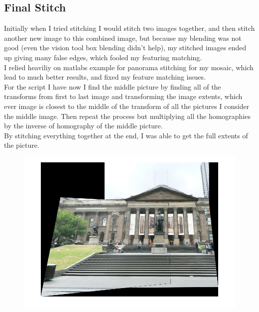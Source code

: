 \documentclass[11pt,english]{article}
\begin{document}
\subsection*{Final Stitch }
Initially when I tried stitching I would stitch two images together, and then stitch another new image to this combined image, but because my blending was not good (even the vision tool box blending didn't help), my stitched images ended up giving many false edges, which fooled my featuring matching. \\
I relied heaviliy on matlabs example for panorama stitching for my mosaic, which lead to much better results, and fixed my feature matching issues.
\\
For the script I have now I find the middle picture by finding all of the transforms from first to last image and transforming the image extents, which ever image is closest to the middle of the transform of all the pictures I consider the middle image. Then repeat the process but multiplying all the homographies by the inverse of homography of the middle picture.\\
By stitching everything together at the end, I was able to get the full extents of the picture. 
\begin{figure}[h]
\includegraphics[width = \linewidth]{art_museum}
\end{figure}
\end{document}
